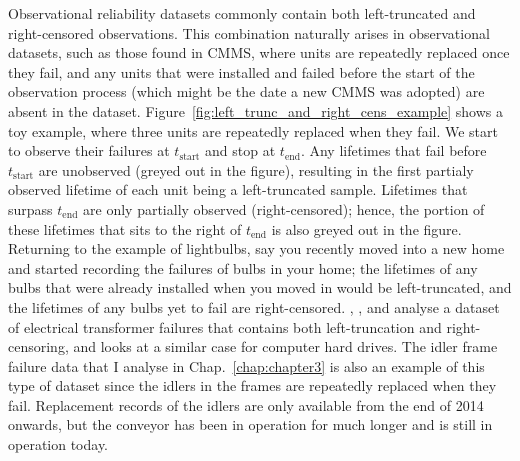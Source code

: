 Observational reliability datasets commonly contain both left-truncated and right-censored observations. This combination naturally arises in observational datasets, such as those found in CMMS, where units are repeatedly replaced once they fail, and any units that were installed and failed before the start of the observation process (which might be the date a new CMMS was adopted) are absent in the dataset. Figure~\ref{fig:left_trunc_and_right_cens_example} shows a toy example, where three units are repeatedly replaced when they fail. We start to observe their failures at $t_{\text{start}}$ and stop at $t_{\text{end}}$. Any lifetimes that fail before $t_{\text{start}}$ are unobserved (greyed out in the figure), resulting in the first partialy observed lifetime of each unit being a left-truncated sample. Lifetimes that surpass $t_{\text{end}}$ are only partially observed (right-censored); hence, the portion of these lifetimes that sits to the right of $t_{\text{end}}$ is also greyed out in the figure. Returning to the example of lightbulbs, say you recently moved into a new home and started recording the failures of bulbs in your home; the lifetimes of any bulbs that were already installed when you moved in would be left-truncated, and the lifetimes of any bulbs yet to fail are right-censored. \citet{hong2009}, \citet{mitra2013}, and \citet{kundu2016} analyse a dataset of electrical transformer failures that contains both left-truncation and right-censoring, and \citet{mittman2013} looks at a similar case for computer hard drives. The idler frame failure data that I analyse in Chap.~\ref{chap:chapter3} is also an example of this type of dataset since the idlers in the frames are repeatedly replaced when they fail. Replacement records of the idlers are only available from the end of 2014 onwards, but the conveyor has been in operation for much longer and is still in operation today.

